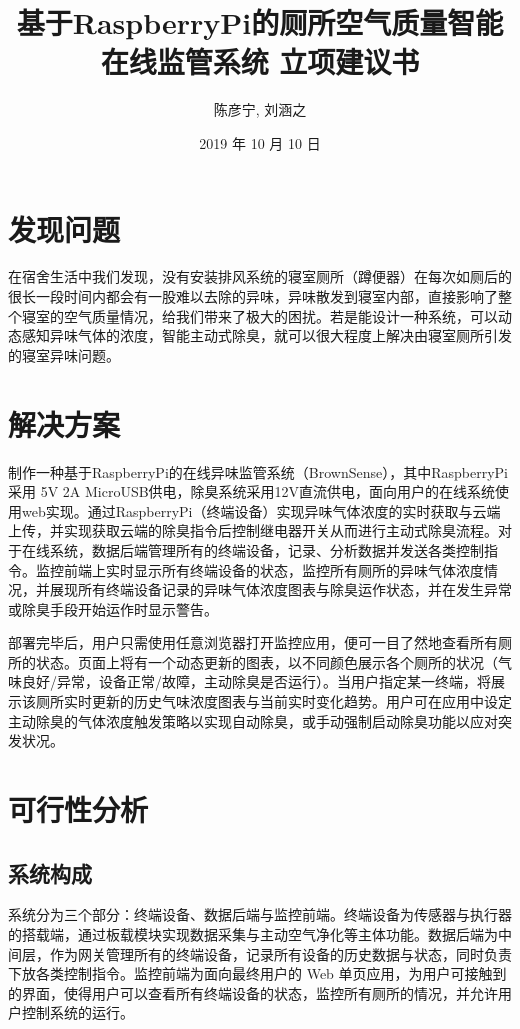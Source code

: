 \documentclass[UTF8]{ctexart}
\title{基于RaspberryPi的厕所空气质量智能在线监管系统 立项建议书}
\author{陈彦宁, 刘涵之}
\date{2019 年 10 月 10 日}
\begin{document}
\maketitle
\pagebreak
\tableofcontents
\pagebreak
\section{发现问题}
在宿舍生活中我们发现，没有安装排风系统的寝室厕所（蹲便器）在每次如厕后的很长一段时间内都会有一股难以去除的异味，异味散发到寝室内部，直接影响了整个寝室的空气质量情况，给我们带来了极大的困扰。若是能设计一种系统，可以动态感知异味气体的浓度，智能主动式除臭，就可以很大程度上解决由寝室厕所引发的寝室异味问题。
\section{解决方案}
制作一种基于RaspberryPi的在线异味监管系统（BrownSense），其中RaspberryPi采用 5V 2A MicroUSB供电，除臭系统采用12V直流供电，面向用户的在线系统使用web实现。通过RaspberryPi（终端设备）实现异味气体浓度的实时获取与云端上传，并实现获取云端的除臭指令后控制继电器开关从而进行主动式除臭流程。对于在线系统，数据后端管理所有的终端设备，记录、分析数据并发送各类控制指令。监控前端上实时显示所有终端设备的状态，监控所有厕所的异味气体浓度情况，并展现所有终端设备记录的异味气体浓度图表与除臭运作状态，并在发生异常或除臭手段开始运作时显示警告。

部署完毕后，用户只需使用任意浏览器打开监控应用，便可一目了然地查看所有厕所的状态。页面上将有一个动态更新的图表，以不同颜色展示各个厕所的状况（气味良好/异常，设备正常/故障，主动除臭是否运行）。当用户指定某一终端，将展示该厕所实时更新的历史气味浓度图表与当前实时变化趋势。用户可在应用中设定主动除臭的气体浓度触发策略以实现自动除臭，或手动强制启动除臭功能以应对突发状况。
\section{可行性分析}
\subsection{系统构成}
系统分为三个部分：终端设备、数据后端与监控前端。终端设备为传感器与执行器的搭载端，通过板载模块实现数据采集与主动空气净化等主体功能。数据后端为中间层，作为网关管理所有的终端设备，记录所有设备的历史数据与状态，同时负责下放各类控制指令。监控前端为面向最终用户的 Web 单页应用，为用户可接触到的界面，使得用户可以查看所有终端设备的状态，监控所有厕所的情况，并允许用户控制系统的运行。
\end{document}
